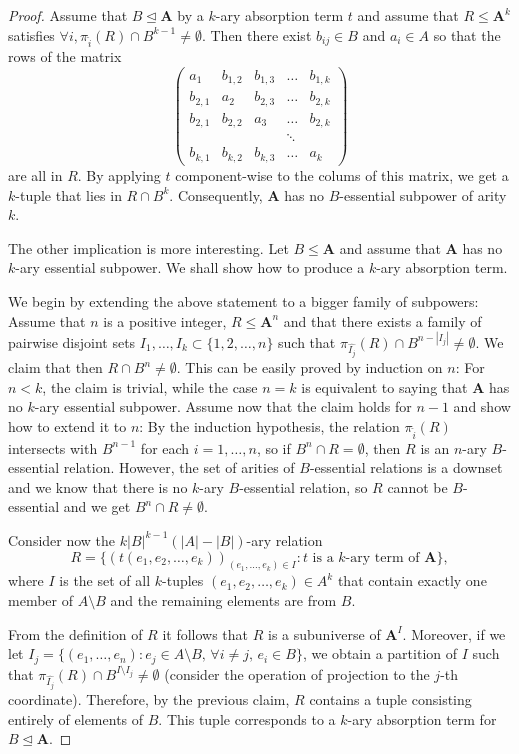 \documentclass{amsart}
\theoremstyle{plain}
\theoremstyle{definition}
\begin{document}
\begin{proof}
  Assume that $B\operatorname{\trianglelefteq}{{\mathbf{A}}}$ by a $k$-ary absorption term $t$ and 
  assume that $R\leq {{\mathbf{A}}}^k$ satisfies $\forall i, \pi_{\widehat i} (R)\cap
  B^{k-1}\neq \emptyset$. Then there exist $b_{ij}\in B$ and $a_i\in A$ so that
  the rows of the matrix
  \[
  \begin{pmatrix}
  a_1&b_{1,2}&b_{1,3}&\dots&b_{1,k}\\
  b_{2,1}&a_2&b_{2,3}&\dots&b_{2,k}\\
    b_{2,1}&b_{2,2}&a_3&\dots&b_{2,k}\\
		       &&&\ddots&\\
  b_{k,1}&b_{k,2}&b_{k,3}&\dots&a_{k}
  \end{pmatrix}
  \]
are all in $R$. By applying $t$ component-wise to the
colums of this matrix, we get a $k$-tuple that lies in $R\cap B^k$. Consequently, ${{\mathbf{A}}}$ has no $B$-essential subpower of arity $k$.

The other implication is more interesting. Let $B\leq{{\mathbf{A}}}$ and assume that
${{\mathbf{A}}}$ has no $k$-ary essential subpower. We shall show how to produce a $k$-ary absorption
term. 

We begin by extending the above statement to a bigger family of subpowers:
Assume that $n$ is a positive integer, $R\leq {{\mathbf{A}}}^n$ and that there exists a family of
pairwise disjoint sets $I_1,\dots,I_k\subset \{1,2,\dots,n\}$ such that
$\pi_{\widehat{I_j}}(R)\cap B^{n-|I_j|}\neq \emptyset$. We claim that then $R\cap B^n\neq
\emptyset$. This can be easily proved by induction on $n$: For $n<k$, the claim
is trivial, while the case $n=k$ is equivalent to saying that ${{\mathbf{A}}}$ has no $k$-ary
essential subpower. Assume now that the claim holds
for $n-1$ and show how to extend it to $n$: By the induction hypothesis, 
the relation $\pi_{\widehat{i}}(R)$ intersects with $B^{n-1}$ for each
$i=1,\dots,n$, so if $B^n\cap R=\emptyset$, then $R$ is an $n$-ary $B$-essential relation. 
However, the set of arities of $B$-essential relations is a downset and we know
that there is no $k$-ary $B$-essential relation, so $R$ cannot be $B$-essential
and we get $B^n\cap R\neq\emptyset$.

Consider now the $k|B|^{k-1}(|A|-|B|)$-ary relation 
\[
  R=\{(t(e_1,e_2,\dots,e_k))_{(e_1,\dots,e_k)\in I} \colon
\text{$t$ is a $k$-ary term of ${{\mathbf{A}}}$}\},
\]
where $I$ is the set of all $k$-tuples $(e_1,e_2,\dots,e_k)\in A^k$ that
contain exactly one member of $A\setminus B$ and the remaining elements are from $B$.

From the definition of $R$ it follows that $R$ is a subuniverse of ${{\mathbf{A}}}^I$. Moreover, if 
we let $I_j=\{(e_1,\dots,e_n) \colon e_j\in A\setminus B,\, \forall i\neq j,\, e_i\in B\}$,
we obtain a partition of $I$  such that 
$\pi_{\widehat{I_j}}(R)\cap B^{I\setminus I_j} \neq \emptyset$ (consider
the operation of projection to the $j$-th coordinate). Therefore, by the previous claim, $R$
 contains a tuple consisting entirely of elements of $B$. This tuple corresponds to a $k$-ary
absorption term for $B\operatorname{\trianglelefteq} {{\mathbf{A}}}$.
\end{proof}
\end{document}
